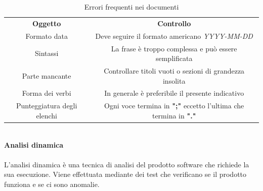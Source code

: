 			\begin{table}[H]
				\centering\renewcommand{\arraystretch}{1.5}
				\caption{Errori frequenti nei documenti}
				\begin{tabular}{c|c}
					
					\rowcolorhead
					{ \textbf{Oggetto}} &
					{ \textbf{Controllo} }\\
					
					\rowcolorlight
					{\colorbody Formato data} & { Deve seguire il formato americano \textit{YYYY-MM-DD}} 
					\\
					
					\rowcolordark
					{\colorbody Sintassi} & {  La frase è troppo complessa e può essere semplificata } 
					\\	
					
					\rowcolorlight
					{\colorbody Parte mancante} & { Controllare titoli vuoti o sezioni di grandezza insolita} 
					\\
					
					\rowcolordark
					{\colorbody Forma dei verbi} & { In generale è preferibile il presente indicativo} 
					\\
					
					\rowcolorlight
					{ Punteggiatura degli elenchi} & { Ogni voce termina in \textbf{";"} eccetto l'ultima che termina in \textbf{"."}} 
					\\
				\end{tabular}
			\end{table}

			\mbox{}\\								
			\textbf{Analisi dinamica} \mbox{}\\ \mbox{}\\
			L'analisi dinamica è una tecnica di analisi del prodotto software che richiede la sua esecuzione. Viene effettuata  mediante dei test che verificano se il prodotto funziona e se ci sono anomalie. 
			
